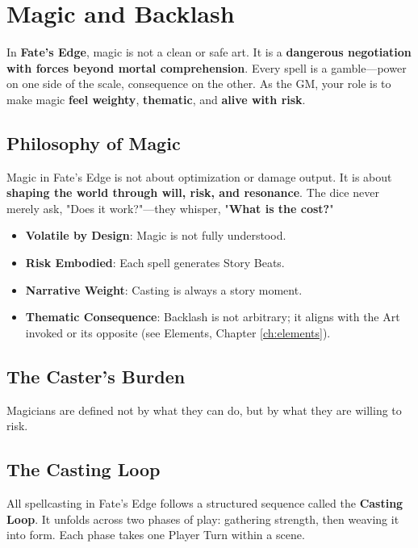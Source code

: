 \chapter{Magic and Backlash}

In \textbf{Fate's Edge}, magic is not a clean or safe art. It is a \textbf{dangerous negotiation with forces beyond mortal comprehension}. Every spell is a gamble---power on one side of the scale, consequence on the other. As the GM, your role is to make magic \textbf{feel weighty}, \textbf{thematic}, and \textbf{alive with risk}.

\section*{Philosophy of Magic}

Magic in Fate's Edge is not about optimization or damage output. It is about \textbf{shaping the world through will, risk, and resonance}. The dice never merely ask, "Does it work?"---they whisper, "\textbf{What is the cost?}"

\begin{itemize}
    \item \textbf{Volatile by Design}: Magic is not fully understood.
    \item \textbf{Risk Embodied}: Each spell generates Story Beats.
    \item \textbf{Narrative Weight}: Casting is always a story moment.
    \item \textbf{Thematic Consequence}: Backlash is not arbitrary; it aligns with the Art invoked or its opposite (see Elements, Chapter \ref{ch:elements}).
\end{itemize}

\section*{The Caster's Burden}

Magicians are defined not by what they can do, but by what they are willing to risk.

\section*{The Casting Loop}

All spellcasting in Fate's Edge follows a structured sequence called the \textbf{Casting Loop}. It unfolds across two phases of play: gathering strength, then weaving it into form. Each phase takes one Player Turn within a scene.

